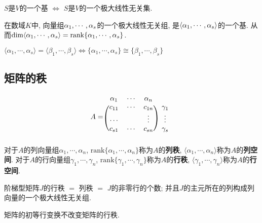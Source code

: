 \begin{Proposition}
$S$是$V$的一个基 $\iff$ $S$是$V$的一个极大线性无关集.
\end{Proposition}

\begin{Proposition}[!!]
在数域$K$中, 向量组$\alpha_{1}, \cdots, \alpha_{s}$的一个极大线性无关组, 是$\langle \alpha_{1}, \cdots, \alpha_{s} \rangle$的一个基. 从而$\dim \langle \alpha_{1}, \cdots, \alpha_{s} \rangle = \operatorname{rank} \{
\alpha_{1}, \cdots, \alpha_{s} \}$.
\end{Proposition}

\begin{Proposition}
$ \langle \alpha_1, \cdots, \alpha_s \rangle = \langle \beta_1, \cdots, \beta_s \rangle 
\iff 
\{ \alpha_1, \cdots, \alpha_s \} \cong  \{ \beta_1, \cdots, \beta_s \} $
\end{Proposition}

\subsection{矩阵的秩}

\begin{Definition}
$$
A = 
\begin{blockarray}{cccc}
\alpha_1 & \cdots & \alpha_n & \\
\begin{block}{(ccc)c}
c_{11}     & \cdots & c_{1n} & \gamma_1 \\
\cdots     &        & \vdots & \vdots \\
c_{s1}     & \cdots & c_{sn} & \gamma_s \\
\end{block}
\end{blockarray}
$$
对于$A$的列向量组$ \alpha_1, \cdots, \alpha_n$, $\text{rank} \{ \alpha_1, \cdots, \alpha_n \}$称为$A$的\textbf{列秩}, $\langle \alpha_1, \cdots, \alpha_n \rangle$称为$A$的\textbf{列空间}.
对于$A$的行向量组$ \gamma_1, \cdots, \gamma_n$, $\text{rank} \{ \gamma_1, \cdots, \gamma_n \}$称为$A$的\textbf{行秩}, $\langle \gamma_1, \cdots, \gamma_n \rangle$称为$A$的\textbf{行空间}.

\end{Definition}

\begin{Theorem}
阶梯型矩阵$J$的行秩 $=$ 列秩 $=$ $J$的非零行的个数; 并且$J$的主元所在的列构成列向量的一个极大线性无关组.
\end{Theorem}

\begin{Theorem}
矩阵的初等行变换不改变矩阵的行秩.
\end{Theorem}

